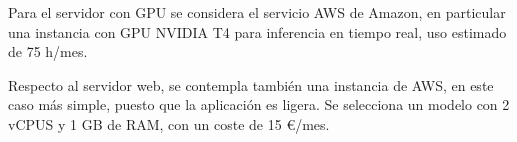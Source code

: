 Para el servidor con GPU se considera el servicio AWS de Amazon, en particular una instancia con GPU NVIDIA T4 para inferencia en tiempo real, 
uso estimado de 75 h/mes.

Respecto al servidor web, se contempla también una instancia de AWS, en este caso más simple, puesto que la aplicación es ligera. Se selecciona un 
modelo con 2 vCPUS y 1 GB de RAM, con un coste de 15 €/mes.